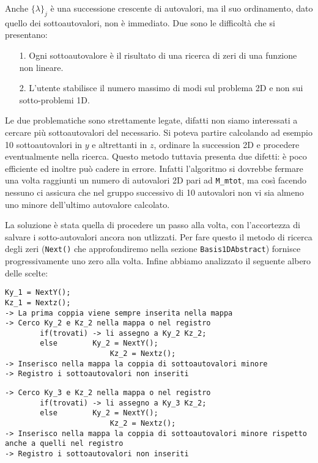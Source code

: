 Anche $\{\lambda\}_j$ \`e una successione crescente di autovalori, ma il suo ordinamento, dato quello dei sottoautovalori, non \`e immediato. Due sono le difficolt\`a che si presentano:
\begin{itemize}
\item[1.] Ogni sottoautovalore \`e il risultato di una ricerca di zeri di una funzione non lineare.
\item[2.] L'utente stabilisce il numero massimo di modi sul problema 2D e non sui sotto-problemi 1D.
\end{itemize}

Le due problematiche sono strettamente legate, difatti non siamo interessati a cercare pi\`u sottoautovalori del necessario. Si poteva partire calcolando ad esempio 10 sottoautovalori in $y$ e altrettanti in $z$, ordinare la succession 2D e procedere eventualmente nella ricerca. Questo metodo tuttavia presenta due difetti: \`e poco efficiente ed inoltre pu\`o cadere in errore. Infatti l'algoritmo si dovrebbe fermare una volta raggiunti un numero di autovalori 2D pari ad \texttt{M\_mtot}, ma cos\`i facendo nessuno ci assicura che nel gruppo successivo di 10 autovalori non vi sia almeno uno minore dell'ultimo autovalore calcolato.

La soluzione \`e stata quella di procedere un passo alla volta, con l'accortezza di salvare i sotto-autovalori ancora non utlizzati. Per fare questo il metodo di ricerca degli zeri (\texttt{Next()} che approfondiremo nella sezione \texttt{Basis1DAbstract}) fornisce progressivamente uno zero alla volta. Infine abbiamo analizzato il seguente albero delle scelte:

\begin{lstlisting}[style = general,frame = top]
Ky_1 = NextY();
Kz_1 = Nextz();
-> La prima coppia viene sempre inserita nella mappa
-> Cerco Ky_2 e Kz_2 nella mappa o nel registro
		if(trovati) -> li assegno a Ky_2 Kz_2;
		else		Ky_2 = NextY();
						Kz_2 = Nextz();
-> Inserisco nella mappa la coppia di sottoautovalori minore
-> Registro i sottoautovalori non inseriti
\end{lstlisting}


\begin{lstlisting}[style = general,frame = top]
-> Cerco Ky_3 e Kz_2 nella mappa o nel registro
		if(trovati) -> li assegno a Ky_3 Kz_2;
		else		Ky_2 = NextY();
						Kz_2 = Nextz();
-> Inserisco nella mappa la coppia di sottoautovalori minore rispetto anche a quelli nel registro
-> Registro i sottoautovalori non inseriti
\end{lstlisting}


